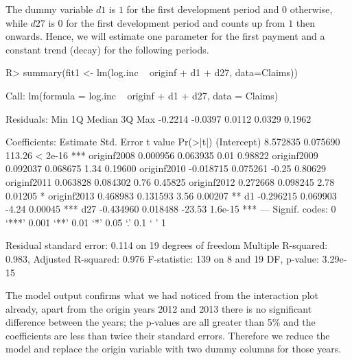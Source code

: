 \documentclass{article}
\begin{document}
The dummy variable $d1$ is $1$ for the first development period and $0$ 
otherwise, while $d27$ is $0$ for the first development period and counts 
up from $1$ then onwards. Hence, we will estimate one parameter for the first 
payment and a constant trend (decay) for the following periods.
\begin{Schunk}
\begin{Sinput}
R> summary(fit1 <- lm(log.inc ~  originf + d1 + d27, data=Claims))
\end{Sinput}
\begin{Soutput}
Call:
lm(formula = log.inc ~ originf + d1 + d27, data = Claims)

Residuals:
    Min      1Q  Median      3Q     Max 
-0.2214 -0.0397  0.0112  0.0329  0.1962 

Coefficients:
             Estimate Std. Error t value Pr(>|t|)    
(Intercept)  8.572835   0.075690  113.26  < 2e-16 ***
originf2008  0.000956   0.063935    0.01  0.98822    
originf2009  0.092037   0.068675    1.34  0.19600    
originf2010 -0.018715   0.075261   -0.25  0.80629    
originf2011  0.063828   0.084302    0.76  0.45825    
originf2012  0.272668   0.098245    2.78  0.01205 *  
originf2013  0.468983   0.131593    3.56  0.00207 ** 
d1          -0.296215   0.069903   -4.24  0.00045 ***
d27         -0.434960   0.018488  -23.53  1.6e-15 ***
---
Signif. codes:  0 ‘***’ 0.001 ‘**’ 0.01 ‘*’ 0.05 ‘.’ 0.1 ‘ ’ 1

Residual standard error: 0.114 on 19 degrees of freedom
Multiple R-squared:  0.983,	Adjusted R-squared:  0.976 
F-statistic:  139 on 8 and 19 DF,  p-value: 3.29e-15
\end{Soutput}
\end{Schunk}
The model output confirms what we had noticed from the interaction
plot already, apart from the origin years 2012 and 2013 there is no 
significant difference between the years; the p-values are all greater than 5\% and
the coefficients are less than twice their standard errors. 
Therefore we reduce the model and replace the origin variable with two dummy 
columns for those years.
\end{document}
